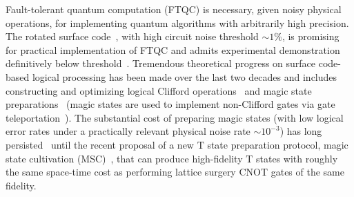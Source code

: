 \documentclass[reprint,aps,twocolumn,superscriptaddress,showpacs,notitlepage,10pt]{revtex4-2}
\theoremstyle{definition}
\begin{document}
Fault-tolerant quantum computation (FTQC) is necessary, given noisy physical operations, for implementing quantum algorithms with arbitrarily high precision. The rotated surface code~\cite{bravyi_quantum_1998,dennis_topological_2002,horsman_surface_2013}, with high circuit noise threshold $\sim 1\%$, is promising for practical implementation of FTQC and admits experimental demonstration definitively below threshold~\cite{google_quantum_ai_and_collaborators_quantum_2025}. Tremendous theoretical progress on surface code-based logical processing has been made over the last two decades and includes constructing and optimizing logical Clifford operations~\cite{fowler_surface_2012,horsman_surface_2013,litinski_game_2019,bombin_logical_2023,beverland_fault_2024,geher_error-corrected_hadamard_2024,brown_poking_2017,gidney_inplace_2024,moussa_transversal_2016,chen_transversal_2024} and magic state preparations~\cite{bravyi_universal_2005,fowler_bridge_2012,fowler_surface_2012,li_2015,litinski_game_2019,fowler_low_2019,gidney_efficient_ccz_catalyzed_2019,gidney_flexible_autoccz_2019,itogawa_even_2024,hirano_leveraging_2024} (magic states are used to implement non-Clifford gates via gate teleportation~\cite{gottesman_demonstrating_1999,zhou_methodology_2000}). The substantial cost of preparing magic states (with low logical error rates under a practically relevant physical noise rate $\sim 10^{-3}$) has long persisted~\cite{fowler_bridge_2012,fowler_surface_2012,litinski_game_2019,fowler_low_2019,gidney_efficient_ccz_catalyzed_2019,gidney_flexible_autoccz_2019,itogawa_even_2024,hirano_leveraging_2024,vasmer_2019_3d_surface_code,chamberland_very_2020,heussen2024efficientfaulttolerantcodeswitching,lee_low-overhead_2024} until the recent proposal of  a new $\mathrm{T}$ state preparation protocol, magic state cultivation (MSC)~\cite{gidney_magic_2024}, that can produce high-fidelity $\mathrm{T}$ states with roughly the same space-time cost as performing lattice surgery CNOT gates of the same fidelity.    
\end{document}
